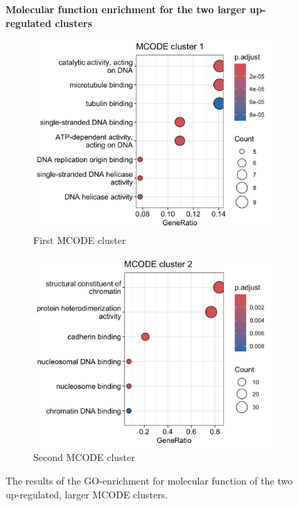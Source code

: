  \begin{figure}[htb!]
 	\centering
 	\caption*{\textbf{Molecular function enrichment for the two larger up-regulated clusters}}
		\begin{subfigure}{.49\textwidth}
			\centering
 			\includegraphics[width=\textwidth]{fig/mf-mcode-cluster1}
 			\caption{First MCODE cluster}
 		\end{subfigure}
    	\begin{subfigure}{.49\textwidth}
    		\centering
 			\includegraphics[width=\textwidth]{fig/mf-mcode-cluster2.png}
 			\caption{Second MCODE cluster}
 		\end{subfigure}
 	\caption{The results of the GO-enrichment for molecular function of the two up-regulated, larger MCODE clusters.}
 	\label{fig:mcode-cluster-mf}
 \end{figure}


